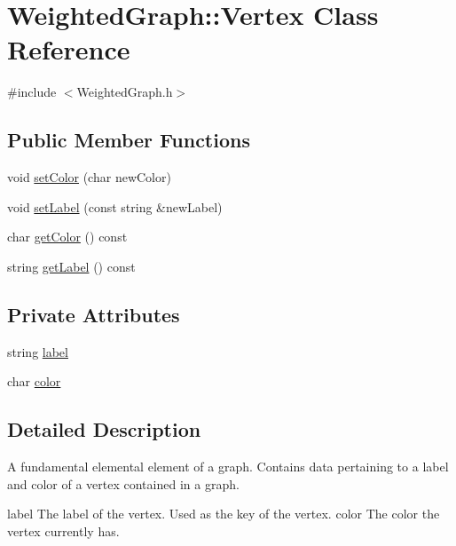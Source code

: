 \hypertarget{class_weighted_graph_1_1_vertex}{\section{\-Weighted\-Graph\-:\-:\-Vertex \-Class \-Reference}
\label{class_weighted_graph_1_1_vertex}
}


{\ttfamily \#include $<$\-Weighted\-Graph.\-h$>$}

\subsection*{\-Public \-Member \-Functions}
\begin{DoxyCompactItemize}
\item 
void \hyperlink{class_weighted_graph_1_1_vertex_ac4fcd685324729f5956640cad824caad}{set\-Color} (char new\-Color)
\item 
void \hyperlink{class_weighted_graph_1_1_vertex_afeacbff508350a8d2142369cc0ee09ba}{set\-Label} (const string \&new\-Label)
\item 
char \hyperlink{class_weighted_graph_1_1_vertex_a4b10c5c1a23bc100385c33b9a40a65eb}{get\-Color} () const 
\item 
string \hyperlink{class_weighted_graph_1_1_vertex_a09bc4b28b77ed88f70df2438eecb1990}{get\-Label} () const 
\end{DoxyCompactItemize}
\subsection*{\-Private \-Attributes}
\begin{DoxyCompactItemize}
\item 
string \hyperlink{class_weighted_graph_1_1_vertex_a9653450774bc621cac91b9a403f4062e}{label}
\item 
char \hyperlink{class_weighted_graph_1_1_vertex_a56942930088e9bdf0d8a79138ccc679c}{color}
\end{DoxyCompactItemize}


\subsection{\-Detailed \-Description}
\-A fundamental elemental element of a graph. \-Contains data pertaining to a label and color of a vertex contained in a graph.

label \-The label of the vertex. \-Used as the key of the vertex.  color \-The color the vertex currently has. 

